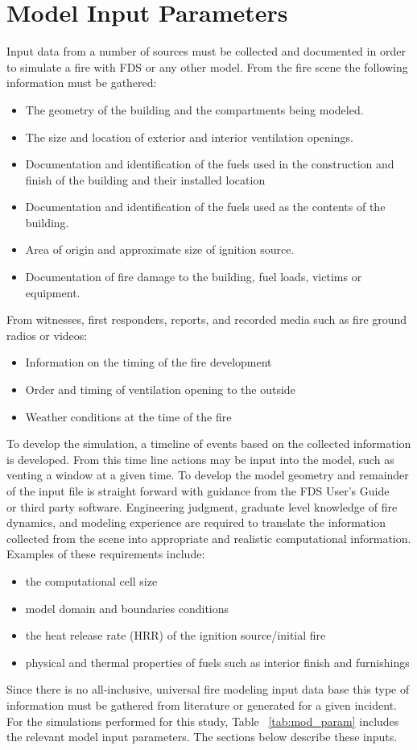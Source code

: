 \documentclass[11pt,oneside]{book}
\begin{document}
\chapter{Model Input Parameters}
Input data from a number of sources must be collected and documented in order to simulate a fire with FDS or any other model. 
From the fire scene the following information must be gathered:
\begin{itemize}
\item The geometry of the building and the compartments being modeled.
\item The size and location of exterior and interior ventilation openings. 
\item Documentation and identification of the fuels used in the construction and finish of the building and their installed location
\item Documentation and identification of the fuels used as the contents of the building. 
\item Area of origin and approximate size of ignition source.
\item Documentation of fire damage to the building, fuel loads, victims or equipment.
\end{itemize}
From witnesses, first responders, reports, and recorded media such as fire ground radios or videos:
\begin{itemize}
\item Information on the timing of the fire development
\item Order and timing of ventilation opening to the outside
\item Weather conditions at the time of the fire
\end{itemize}
To develop the simulation, a timeline of events based on the collected information is developed. From this time line actions may be input into the model, such as venting a window at a given time. To develop the model geometry and remainder of the input file is straight forward with guidance from the FDS User's Guide ~\cite{FDS_Users_Guide} or third party software.  Engineering judgment, graduate level knowledge of fire dynamics, and modeling experience are required to  translate the information collected from the scene into appropriate and realistic computational information.  Examples of these requirements include:
\begin{itemize}
\item the computational cell size
\item model domain and boundaries conditions
\item the heat release rate (HRR) of the ignition source/initial fire
\item physical and thermal properties of fuels such as interior finish and furnishings
\end{itemize}
Since there is no all-inclusive, universal fire modeling input data base this type of information must be gathered from literature or generated for a given incident. For the simulations performed for this study, Table ~\ref{tab:mod_param} includes the relevant model input parameters. The sections below describe these inputs. 
\end{document}
